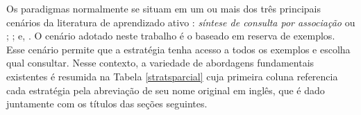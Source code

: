 Os paradigmas normalmente se situam em um ou mais dos três principais
cenários da literatura de aprendizado ativo
\citep{settles2010active}:
\textit{síntese de consulta por associação} ou
;
; e,
.
O cenário adotado neste trabalho é o baseado em reserva de exemplos.
Esse cenário permite que a estratégia tenha acesso a todos os exemplos
e escolha qual consultar.
Nesse contexto, a variedade de abordagens fundamentais existentes é resumida na
Tabela \ref{stratsparcial} cuja primeira coluna referencia cada estratégia pela abreviação
de seu nome original em inglês, que é dado juntamente com os títulos das seções seguintes.
